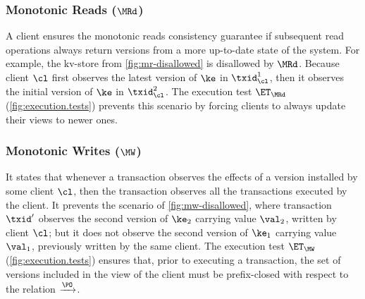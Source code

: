 \subsubsection{Monotonic Reads ($\MRd$)}
A client ensures the monotonic reads consistency guarantee if subsequent read operations always 
return versions from a more up-to-date state of the system. For example, the kv-store from \cref{fig:mr-disallowed} is disallowed 
by $\MRd$.
Because client $\cl$ first observes the latest version of $\ke$ in $\txid_{\cl}^{1}$, then it
observes the initial version of $\ke$ in $\txid_{\cl}^{2}$.
The execution test $\ET_{\MRd}$ (\cref{fig:execution.tests}) prevents this scenario by 
forcing clients to always update their views to newer ones. 

\subsubsection{Monotonic Writes ($\MW$)}
It states that whenever a transaction observes the effects of a version installed by some client $\cl$, then 
the transaction observes all the transactions executed by the client. It prevents 
the scenario of \cref{fig:mw-disallowed}, where transaction $\txid'$ observes the 
second version of $\ke_2$ carrying value $\val_2$, written by client $\cl$; but it does not observe the second version 
of $\ke_1$ carrying value $\val_1$, previously written by the same client.
The execution test $\ET_{\MW}$ (\cref{fig:execution.tests}) ensures 
that, prior to executing a transaction, the set of versions included in the view of the client 
must be prefix-closed with respect to the relation $\xrightarrow{\PO}$.

